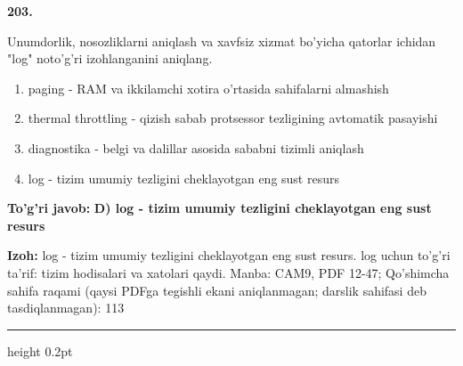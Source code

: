 \documentclass[10pt,a4paper]{article}
\begin{document}
{\bfseries\sffamily\color{ink} 203.}
\par
Unumdorlik, nosozliklarni aniqlash va xavfsiz xizmat bo'yicha qatorlar ichidan "log" noto'g'ri izohlanganini aniqlang.
\begin{enumerate}[label=\Alph*),leftmargin=9mm]
\item paging - RAM va ikkilamchi xotira o'rtasida sahifalarni almashish
\item thermal throttling - qizish sabab protsessor tezligining avtomatik pasayishi
\item diagnostika - belgi va dalillar asosida sababni tizimli aniqlash
\item log - tizim umumiy tezligini cheklayotgan eng sust resurs
\end{enumerate}
\begin{tcolorbox}[enhanced,breakable,colback=teal!4,colframe=teal!60!black,boxrule=0.45pt,arc=1.2mm,left=2.7mm,right=2.7mm,top=1.8mm,bottom=1.8mm,before skip=2mm,after skip=2mm]
{\bfseries\sffamily\color{teal}To'g'ri javob:} \textbf{D) log - tizim umumiy tezligini cheklayotgan eng sust resurs}
\par\smallskip
{\bfseries Izoh:} log - tizim umumiy tezligini cheklayotgan eng sust resurs. log uchun to'g'ri ta'rif: tizim hodisalari va xatolari qaydi. Manba: CAM9, PDF 12-47; Qo'shimcha sahifa raqami (qaysi PDFga tegishli ekani aniqlanmagan; darslik sahifasi deb tasdiqlanmagan): 113
\end{tcolorbox}
\vspace{2mm}\hrule height 0.2pt\vspace{3mm}
\end{document}
